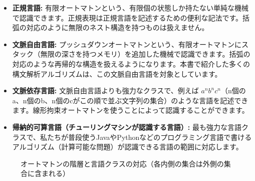 \begin{itemize}
\tightlist
\item
  \textbf{正規言語:}
  有限オートマトンという、有限個の状態しか持たない単純な機械で認識できます。正規表現は正規言語を記述するための便利な記法です。括弧の対応のように無限のネスト構造を持つものは扱えません。
\item
  \textbf{文脈自由言語:}
  プッシュダウンオートマトンという、有限オートマトンにスタック（無限の深さを持つメモリ）を追加した機械で認識できます。括弧の対応のような再帰的な構造を扱えるようになります。本書で紹介した多くの構文解析アルゴリズムは、この文脈自由言語を対象としています。
\item
  \textbf{文脈依存言語:} 文脈自由言語よりも強力なクラスで、例えば
  \(a^n b^n c^n\)（n個のa、n個のb、n個のcがこの順で並ぶ文字列の集合）のような言語を記述できます。線形拘束オートマトンを使うことによって認識することができます。

\item
  \textbf{帰納的可算言語（チューリングマシンが認識する言語）:}
  最も強力な言語クラスで、私たちが普段使うJavaやPythonなどのプログラミング言語で書けるアルゴリズム（計算可能な問題）が認識できる言語の範囲に対応します。
\end{itemize}

\begin{figure}[h]
\centering
{}
\caption{オートマトンの階層と言語クラスの対応（各内側の集合は外側の集合に含まれる）}
\label{fig:automaton-hierarchy}
\end{figure}

